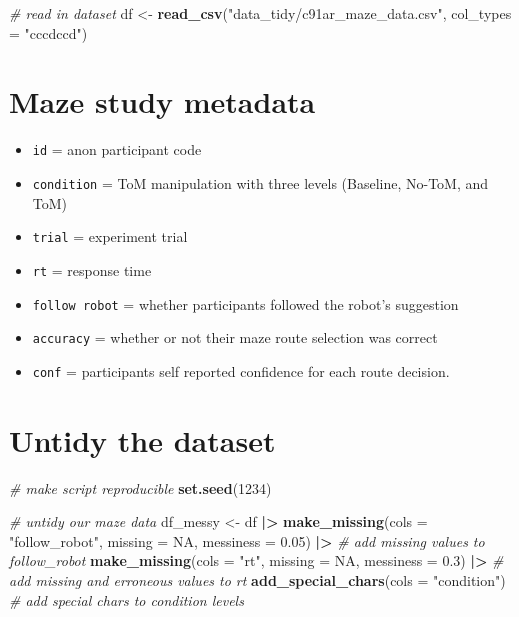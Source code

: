 \documentclass[
]{article}
\newenvironment{Shaded}{\begin{snugshade}}{\end{snugshade}}
\newcommand{\AttributeTok}[1]{\textcolor[rgb]{0.13,0.29,0.53}{#1}}
\newcommand{\CommentTok}[1]{\textcolor[rgb]{0.56,0.35,0.01}{\textit{#1}}}
\newcommand{\ConstantTok}[1]{\textcolor[rgb]{0.56,0.35,0.01}{#1}}
\newcommand{\DecValTok}[1]{\textcolor[rgb]{0.00,0.00,0.81}{#1}}
\newcommand{\FloatTok}[1]{\textcolor[rgb]{0.00,0.00,0.81}{#1}}
\newcommand{\FunctionTok}[1]{\textcolor[rgb]{0.13,0.29,0.53}{\textbf{#1}}}
\newcommand{\NormalTok}[1]{#1}
\newcommand{\OtherTok}[1]{\textcolor[rgb]{0.56,0.35,0.01}{#1}}
\newcommand{\SpecialCharTok}[1]{\textcolor[rgb]{0.81,0.36,0.00}{\textbf{#1}}}
\newcommand{\StringTok}[1]{\textcolor[rgb]{0.31,0.60,0.02}{#1}}
\providecommand{\tightlist}{%
  \setlength{\itemsep}{0pt}\setlength{\parskip}{0pt}}
\begin{document}
\begin{Shaded}
\begin{Highlighting}[]
\CommentTok{\# read in dataset}
\NormalTok{df }\OtherTok{\textless{}{-}}
  \FunctionTok{read\_csv}\NormalTok{(}\StringTok{"data\_tidy/c91ar\_maze\_data.csv"}\NormalTok{,}
           \AttributeTok{col\_types =} \StringTok{"cccdccd"}\NormalTok{)}
\end{Highlighting}
\end{Shaded}

\hypertarget{maze-study-metadata}{%
\section{Maze study metadata}\label{maze-study-metadata}}

\begin{itemize}
\tightlist
\item
  \texttt{id} = anon participant code
\item
  \texttt{condition} = ToM manipulation with three levels (Baseline,
  No-ToM, and ToM)
\item
  \texttt{trial} = experiment trial
\item
  \texttt{rt} = response time
\item
  \texttt{follow\ robot} = whether participants followed the robot's
  suggestion
\item
  \texttt{accuracy} = whether or not their maze route selection was
  correct
\item
  \texttt{conf} = participants self reported confidence for each route
  decision.
\end{itemize}

\hypertarget{untidy-the-dataset}{%
\section{Untidy the dataset}\label{untidy-the-dataset}}

\begin{Shaded}
\begin{Highlighting}[]
\CommentTok{\# make script reproducible}
\FunctionTok{set.seed}\NormalTok{(}\DecValTok{1234}\NormalTok{)}

\CommentTok{\# untidy our maze data}
\NormalTok{df\_messy }\OtherTok{\textless{}{-}}
\NormalTok{  df }\SpecialCharTok{|\textgreater{}}
  \FunctionTok{make\_missing}\NormalTok{(}\AttributeTok{cols =} \StringTok{"follow\_robot"}\NormalTok{, }
               \AttributeTok{missing =} \ConstantTok{NA}\NormalTok{,}
               \AttributeTok{messiness =} \FloatTok{0.05}\NormalTok{) }\SpecialCharTok{|\textgreater{}} \CommentTok{\# add missing values to follow\_robot}
  \FunctionTok{make\_missing}\NormalTok{(}\AttributeTok{cols =} \StringTok{"rt"}\NormalTok{,}
               \AttributeTok{missing =} \ConstantTok{NA}\NormalTok{,}
               \AttributeTok{messiness =} \FloatTok{0.3}\NormalTok{) }\SpecialCharTok{|\textgreater{}} \CommentTok{\# add missing and erroneous values to rt}
  \FunctionTok{add\_special\_chars}\NormalTok{(}\AttributeTok{cols =} \StringTok{"condition"}\NormalTok{) }\CommentTok{\# add special chars to condition levels}
\end{Highlighting}
\end{Shaded}
\end{document}
